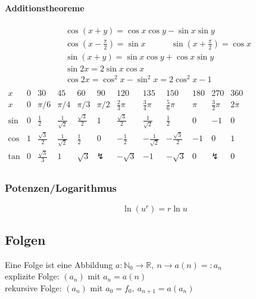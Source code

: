 \documentclass[6pt,a4paper]{scrartcl}
\newcommand{\enbrace}[1]{\ensuremath{\left(#1\right)}}
\begin{document}
\begin{multicols*}{4}
\paragraph{Additionstheoreme} %
\label{par:additionstheoreme}
 \begin{eqnarray*}
 	& \cos (x + y) = \cos x \cos y - \sin x \sin y \\
	& \cos \enbrace{x - \frac{\pi}{2}} = \sin x \qquad \quad \sin \enbrace{x + \frac{\pi}{2}} = \cos x \\
    & \sin \enbrace{x + y} = \sin x \cos y + \cos x \sin y \\
& 	\sin 2x = 2 \sin x \cos x        \\
	& \cos 2x = \cos^2 x - \sin^2 x = 2\cos^2 x - 1\\
 \end{eqnarray*}
\hspace{-20pt}
\scalebox{0.77}
{
$\begin{array}{c|c|c|c|c|c|c|c|c|c|c|c}
x & 0& 30 & 45& 60 & 90 & 120 & 135& 150& 180 & 270 & 360 \\ \hline
x & 0 & \pi / 6 & \pi / 4 & \pi / 3 & \pi / 2 & \frac{2}{3}\pi& \frac{3}{4}\pi& \frac{5}{6}\pi& \pi  & \frac{3}{2}\pi & 2 \pi \\ \hline
\sin & 0 & \frac{1}{2} & \frac{1}{\sqrt{2}} & \frac{\sqrt 3}{2} & 1 & \frac{\sqrt 3}{2} & \frac{1}{\sqrt{2}} & \frac{1}{2} & 0 & -1 & 0 \\
\cos & 1 & \frac{\sqrt 3}{2} & \frac{1}{\sqrt 2} & \frac{1}{2} & 0 & -\frac{1}{2} & -\frac{1}{\sqrt 2}  & -\frac{\sqrt 3}{2}   & -1 & 0 & 1 \\
\tan & 0 & \frac{\sqrt{3}}{3}&1 &\sqrt{3} & \lightning & -\sqrt{3}& -1& -\sqrt{3}& 0 & \lightning & 0\\
\end{array}$
}

\subsubsection{Potenzen/Logarithmus}
\begin{equation*}
\ln(u^r)=r\ln u
\end{equation*}

\subsection{Folgen}
Eine Folge ist eine Abbildung $a: \mathbb N_0 \rightarrow \mathbb R,\ n \rightarrow a(n) =: a_n$\\
explizite Folge: $(a_n)$ mit $a_n=a(n)$\\ rekursive Folge: $(a_n)$ mit $a_0=f_0,\  a_{n+1}=a(a_n)$\\


\end{multicols*}
\end{document}
